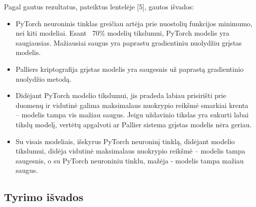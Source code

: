 \documentclass{VUMIFInfBakalaurinis}
\begin{document}
\par Pagal gautus rezultatus, pateiktus lentelėje [5], gautos išvados:
\begin{itemize}
    \item PyTorch neuroninis tinklas greičiau artėja prie nuostolių funkcijos minimumo, nei kiti modeliai. Esant ~70\% modelių tikslumui, PyTorch modelis yra saugiausias. Mažiausiai saugus yra paprastu gradientiniu nuolydžiu grįstas modelis. 
    \item Palliers kriptografija grįstas modelis yra saugesnis už paprastą gradientinio nuolydžio metodą.
    \item Didėjant PyTorch modelio tikslumui, jis pradeda labiau prisirišti prie duomenų ir vidutinė galima maksimalaus nuokrypio reikšmė smarkiai krenta – modelis tampa vis mažiau saugus. Jeigu uždavinio tikslas yra sukurti labai tikslų modelį, vertėtų apgalvoti ar Pallier sistema grįstas modelis nėra geriau.
    \item Su visais modeliais, išskyrus PyTorch neuroninį tinklą, didėjant modelio tikslumui, didėja vidutinė maksimalaus nuokrypio reikšmė – modelis tampa saugesnis, o su PyTorch neuroniniu tinklu, mažėja - modelis tampa mažiau saugus. 
\end{itemize}

\subsection{Tyrimo išvados}




\end{document}
